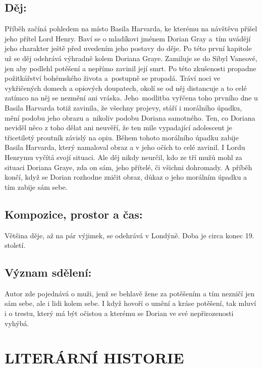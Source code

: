 \documentclass[A4paper]{extarticle} %
\begin{document}
\subsection*{Děj:}
\noindent 
Příběh začíná pohledem na místo Basila Harvarda, ke kterému na návštěvu přišel jeho přítel Lord Henry.
Baví se o mladíkovi jménem Dorian Gray a~tím uvádějí jeho charakter ještě před uvedením jeho postavy do děje.
Po této první kapitole už se děj odehrává výhradně kolem Doriana Graye.
Zamiluje se do Sibyl Vaneové, jen aby podlehl potěšení a nepřímo zavinil její smrt.
Po této zkušenosti propadne požitkářství bohémského života a~postupně se propadá.
Tráví noci ve vykřičených domech a opiových doupatech, okolí se od něj distancuje a to celé zatímco na něj se nezmění ani vráska.
Jeho~modlitba vyřčena toho prvního dne u Basila Harvarda totiž zavinila, že všechny projevy, stáří i morálního úpadku, mění podobu jeho obrazu a~nikoliv podobu Doriana samotného.
Ten, co Doriana neviděl něco z toho dělat ani neuvěří, že ten mile vypadající adolescent je třicetiletý proutník závislý na opiu.
Během tohoto morálního úpadku zabije Basila Harvarda, který namaloval obraz a v jeho očích to celé zavinil.
I Lordu Henrymu vyčítá svojí situaci.
Ale děj nikdy neurčil, kdo ze tří mužů mohl za situaci Doriana Graye, zda on sám, jeho přítelé, či všichni dohromady.
A příběh končí, když se Dorian rozhodne zničit obraz, důkaz o jeho morálním úpadku a tím zabije sám sebe.

\subsection*{Kompozice, prostor a čas:}
\noindent 
Většina děje, až na pár výjimek, se odehrává v Londýně. Doba je circa konec 19. století.

\subsection*{Význam sdělení:}
\noindent 
Autor zde pojednává o muži, jenž se behlavě žene za potěšením a tím nezničí jen sám sebe, ale i lidi kolem sebe.
I když hovoří o umění a kráse potěšení, tak mluví i o trestu, který má být očistou a kterému se Dorian ve své nepřirozenosti vyhýbá.

\section*{LITERÁRNÍ HISTORIE}

\end{document}

